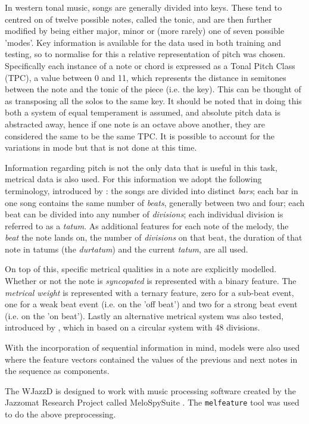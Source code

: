 \documentclass[bsc,singlespacing,parskip,deptreport,twoside,frontabs]{infthesis}
\begin{document}
In western tonal music, songs are generally divided into keys. These tend to centred on of twelve possible notes, called the tonic, and are then further modified by being either major, minor or (more rarely) one of seven possible 'modes'. Key information is available for the data used in both training and testing, so to normalise for this a relative representation of pitch was chosen. Specifically each instance of a note or chord is expressed as a Tonal Pitch Class (TPC), a value between 0 and 11, which represents the distance in semitones between the note and the tonic of the piece (i.e. the key). This can be thought of as transposing all the solos to the same key. It should be noted that in doing this both a system of equal temperament is assumed, and absolute pitch data is abstracted away, hence if one note is an octave above another, they are considered the same to be the same TPC. It is possible to account for the variations in mode \cite{mysong} but that is not done at this time.

Information regarding pitch is not the only data that is useful in this task, metrical data is also used. For this information we adopt the following terminology, introduced by \cite{mel}: the songs are divided into distinct \emph{bars}; each bar in one song contains the same number of \emph{beats}, generally between two and four; each beat can be divided into any number of \emph{divisions}; each individual division is referred to as a \emph{tatum}. As additional features for each note of the melody, the \emph{beat} the note lands on, the number of \emph{divisions} on that beat, the duration of that note in tatums (the \emph{durtatum}) and the current \emph{tatum}, are all used.

On top of this, specific metrical qualities in a note are explicitly modelled. Whether or not the note is \emph{syncopated} is represented with a binary feature. The \emph{metrical weight} is represented with a ternary feature, zero for a sub-beat event, one for a weak beat event (i.e. on the 'off beat') and two for a strong beat event (i.e. on the 'on beat'). Lastly an alternative metrical system was also tested, introduced by \cite{mcm48}, which in based on a circular system with 48 divisions.

With the incorporation of sequential information in mind, models were also used where the feature vectors contained the values of the previous and next notes in the sequence as components.

The WJazzD is designed to work with music processing software created by the Jazzomat Research Project called MeloSpySuite \cite{mel}. The {\tt melfeature} tool was used to do the above preprocessing.
\end{document}
